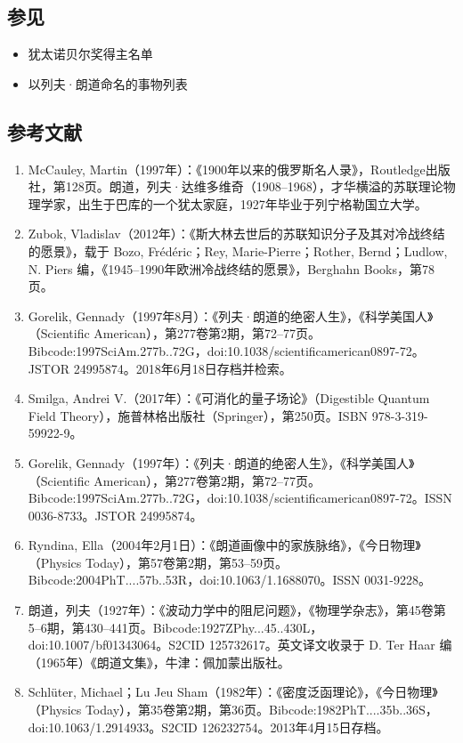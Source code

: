 \subsection{参见}
\begin{itemize}
\item 犹太诺贝尔奖得主名单
\item 以列夫·朗道命名的事物列表
\end{itemize}
\subsection{参考文献}
\begin{enumerate}
\item McCauley, Martin（1997年）：《1900年以来的俄罗斯名人录》，Routledge出版社，第128页。朗道，列夫·达维多维奇（1908–1968），才华横溢的苏联理论物理学家，出生于巴库的一个犹太家庭，1927年毕业于列宁格勒国立大学。
\item Zubok, Vladislav（2012年）：《斯大林去世后的苏联知识分子及其对冷战终结的愿景》，载于 Bozo, Frédéric；Rey, Marie-Pierre；Rother, Bernd；Ludlow, N. Piers 编，《1945–1990年欧洲冷战终结的愿景》，Berghahn Books，第78页。
\item Gorelik, Gennady（1997年8月）：《列夫·朗道的绝密人生》，《科学美国人》（Scientific American），第277卷第2期，第72–77页。Bibcode:1997SciAm.277b..72G，doi:10.1038/scientificamerican0897-72。JSTOR 24995874。2018年6月18日存档并检索。
\item Smilga, Andrei V.（2017年）：《可消化的量子场论》（Digestible Quantum Field Theory），施普林格出版社（Springer），第250页。ISBN 978-3-319-59922-9。
\item Gorelik, Gennady（1997年）：《列夫·朗道的绝密人生》，《科学美国人》（Scientific American），第277卷第2期，第72–77页。Bibcode:1997SciAm.277b..72G，doi:10.1038/scientificamerican0897-72。ISSN 0036-8733。JSTOR 24995874。
\item Ryndina, Ella（2004年2月1日）：《朗道画像中的家族脉络》，《今日物理》（Physics Today），第57卷第2期，第53–59页。Bibcode:2004PhT....57b..53R，doi:10.1063/1.1688070。ISSN 0031-9228。
\item 朗道，列夫（1927年）：《波动力学中的阻尼问题》，《物理学杂志》，第45卷第5–6期，第430–441页。Bibcode:1927ZPhy...45..430L，doi:10.1007/bf01343064。S2CID 125732617。英文译文收录于 D. Ter Haar 编（1965年）《朗道文集》，牛津：佩加蒙出版社。
\item Schlüter, Michael；Lu Jeu Sham（1982年）：《密度泛函理论》，《今日物理》（Physics Today），第35卷第2期，第36页。Bibcode:1982PhT....35b..36S，doi:10.1063/1.2914933。S2CID 126232754。2013年4月15日存档。

\end{enumerate}
